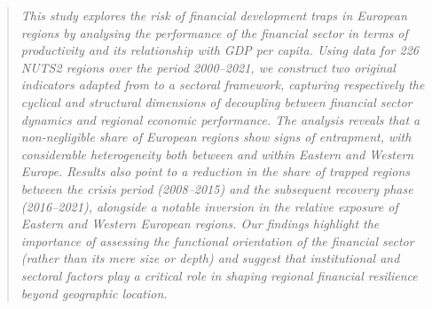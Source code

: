 \documentclass[a4paper,11pt,oneside]{article}
\begin{document}
\begin{spacing}{1}


\maketitle

\thispagestyle{empty}




\begin{abstract}







\textsl{This study explores the risk of financial development traps in European regions by analysing the performance of the financial sector in terms of productivity and its relationship with GDP per capita. Using data for 226 NUTS2 regions over the period 2000--2021, we construct two original indicators adapted from \cite{diemer2022regional} to a sectoral framework, capturing respectively the cyclical and structural dimensions of decoupling between financial sector dynamics and regional economic performance. The analysis reveals that a non-negligible share of European regions show signs of entrapment, with considerable heterogeneity both between and within Eastern and Western Europe. Results also point to a reduction in the share of trapped regions between the crisis period (2008--2015) and the subsequent recovery phase (2016--2021), alongside a notable inversion in the relative exposure of Eastern and Western European regions. Our findings highlight the importance of assessing the functional orientation of the financial sector (rather than its mere size or depth) and suggest that institutional and sectoral factors play a critical role in shaping regional financial resilience beyond geographic location.}







\end{abstract}
\end{spacing}
\end{document}
